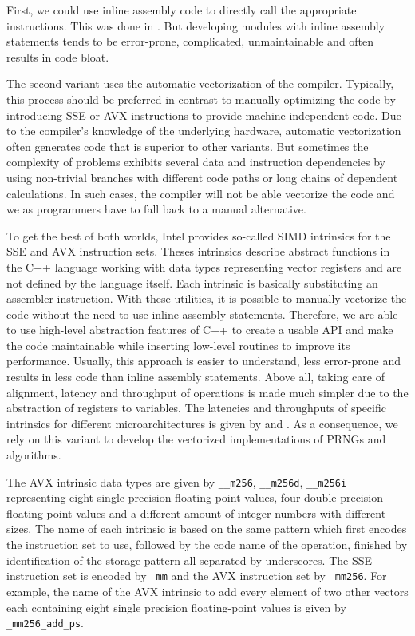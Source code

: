 \documentclass{stdlocal}
\begin{document}
    First, we could use inline assembly code to directly call the appropriate instructions.
    This was done in \textcite{guskova2016,barash2017}.
    But developing modules with inline assembly statements tends to be error-prone, complicated, unmaintainable and often results in code bloat.

    The second variant uses the automatic vectorization of the compiler.
    Typically, this process should be preferred in contrast to manually optimizing the code by introducing SSE or AVX instructions to provide machine independent code.
    Due to the compiler's knowledge of the underlying hardware, automatic vectorization often generates code that is superior to other variants.
    But sometimes the complexity of problems exhibits several data and instruction dependencies by using non-trivial branches with different code paths or long chains of dependent calculations.
    In such cases, the compiler will not be able vectorize the code and we as programmers have to fall back to a manual alternative.

    To get the best of both worlds, Intel provides so-called SIMD intrinsics for the SSE and AVX instruction sets.
    Theses intrinsics describe abstract functions in the C++ language working with data types representing vector registers and are not defined by the language itself.
    Each intrinsic is basically substituting an assembler instruction.
    With these utilities, it is possible to manually vectorize the code without the need to use inline assembly statements.
    Therefore, we are able to use high-level abstraction features of C++ to create a usable API and make the code maintainable while inserting low-level routines to improve its performance.
    Usually, this approach is easier to understand, less error-prone and results in less code than inline assembly statements.
    Above all, taking care of alignment, latency and throughput of operations is made much simpler due to the abstraction of registers to variables.
    The latencies and throughputs of specific intrinsics for different microarchitectures is given by \textcite{intel-intrinsics-guide} and \textcite{fog2019d}.
    As a consequence, we rely on this variant to develop the vectorized implementations of PRNGs and algorithms.

    The AVX intrinsic data types are given by \texttt{\_\_m256}, \texttt{\_\_m256d}, \texttt{\_\_m256i} representing eight single precision floating-point values, four double precision floating-point values and a different amount of integer numbers with different sizes.
    The name of each intrinsic is based on the same pattern which first encodes the instruction set to use, followed by the code name of the operation, finished by identification of the storage pattern all separated by underscores.
    The SSE instruction set is encoded by \texttt{\_mm} and the AVX instruction set by \texttt{\_mm256}.
    For example, the name of the AVX intrinsic to add every element of two other vectors each containing eight single precision floating-point values is given by \texttt{\_mm256\_add\_ps}.
    \autocite{intel-optimization-reference}
\end{document}
